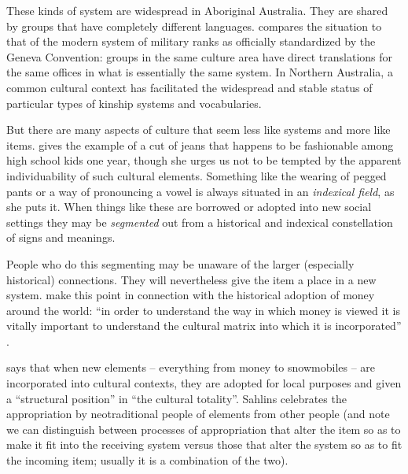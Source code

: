 These kinds of system are widespread in Aboriginal Australia. They are shared by 
groups that have completely different languages. \citet{evans_enigma_2012} compares the 
situation to that of the modern system of military ranks as officially 
standardized by the Geneva Convention: groups in the same culture area have direct translations for the same offices in what is essentially the same system. In Northern Australia, a common cultural context has 
facilitated the widespread and stable status of particular types of 
kinship systems and vocabularies. 



But there are many aspects of culture that seem less 
like systems and more like items. \citet{eckert_variation_2008} gives the example of a cut of 
jeans that happens to be fashionable among high school kids one year, though she urges us not to be tempted by the apparent individuability of 
such cultural elements. Something like the wearing of pegged pants or a 
way of pronouncing a vowel is always situated in an \textit{indexical 
field}, as she puts it. When things like these are borrowed or adopted into new 
social settings they may be \textit{segmented} out from a historical and 
indexical constellation of signs and meanings. 



People who do this segmenting may be unaware of the larger (especially 
historical) connections. They will nevertheless give the item a 
place in a new system. \citet{parry_money_1989} make this point in connection with the historical adoption of money around the world: ``in 
order to understand the way in which money is viewed it is vitally 
important to understand the cultural matrix into which it is 
incorporated'' \citep[1]{parry_money_1989}.



\citet{sahlins_what_1999} says that when new elements -- everything from 
money to snowmobiles -- are incorporated into cultural contexts, they are 
adopted for local purposes and given a ``structural position'' in ``the 
cultural totality''. Sahlins celebrates the appropriation 
by neotraditional people of elements from other people 
(and note we can distinguish between processes of appropriation that 
alter the item so as to make it fit into the receiving system versus 
those that alter the system so as to fit the incoming item; usually it is a combination of the two). 



